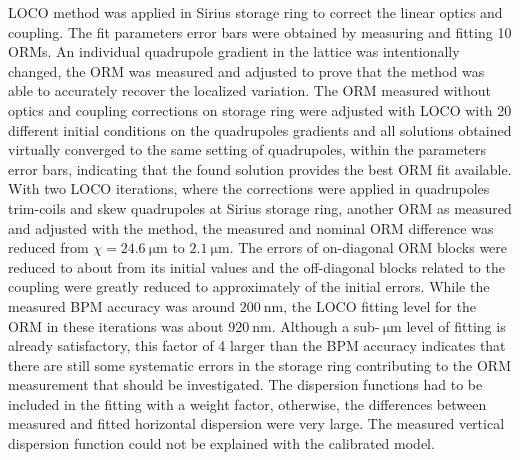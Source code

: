     LOCO method was applied in Sirius storage ring to correct the linear optics and coupling. The fit parameters error bars were obtained by measuring and fitting 10 ORMs. An individual quadrupole gradient in the lattice was intentionally changed, the ORM was measured and adjusted to prove that the method was able to accurately recover the localized variation. The ORM measured without optics and coupling corrections on storage ring were adjusted with LOCO with 20 different initial conditions on the quadrupoles gradients and all solutions obtained virtually converged to the same setting of quadrupoles, within the parameters error bars, indicating that the found solution provides the best ORM fit available. With two LOCO iterations, where the corrections were applied in quadrupoles trim-coils and skew quadrupoles at Sirius storage ring, another ORM as measured and adjusted with the method, the measured and nominal ORM difference was reduced from $\chi = \SI{24.6}{\micro\meter}$ to $\SI{2.1}{\micro\meter}$. The errors of on-diagonal ORM blocks were reduced to about  from its initial values and the off-diagonal blocks related to the coupling were greatly reduced to approximately  of the initial errors. While the measured BPM accuracy was around $\SI{200}{\nano\meter}$, the LOCO fitting level for the ORM in these iterations was about $\SI{920}{\nano\meter}$. Although a sub-$\SI{}{\micro\meter}$ level of fitting is already satisfactory, this factor of 4 larger than the BPM accuracy indicates that there are still some systematic errors in the storage ring contributing to the ORM measurement that should be investigated. The dispersion functions had to be included in the fitting with a weight factor, otherwise, the differences between measured and fitted horizontal dispersion were very large. The measured vertical dispersion function could not be explained with the calibrated model. 
    
